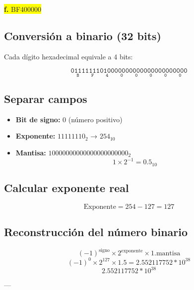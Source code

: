 \documentclass[a4paper,12pt]{article}
\begin{document}
	\begin{center}
		\colorbox{yellow}{\textbf{f.} BF400000}
		\subsection*{Conversión a binario (32 bits)}
		Cada dígito hexadecimal equivale a 4 bits:
		
		\[
		\mathtt{
			\underset{\text{B}}{\boxed{\mathtt{0111}}}
			\underset{\text{F}}{\boxed{\mathtt{1111}}}
			\underset{\text{4}}{\boxed{\mathtt{0100}}}
			\underset{\text{0}}{\boxed{\mathtt{0000}}}
			\underset{\text{0}}{\boxed{\mathtt{0000}}}
			\underset{\text{0}}{\boxed{\mathtt{0000}}}
			\underset{\text{0}}{\boxed{\mathtt{0000}}}
			\underset{\text{0}}{\boxed{\mathtt{0000}}}
		}	
		\]
		
		\subsection*{Separar campos}
		
		\begin{itemize}
			\item \textbf{Bit de signo:} 0 (número positivo)
			\item \textbf{Exponente:} $11111110_2$ → $254_{10}$
			\item \textbf{Mantisa:} $10000000000000000000000_2$ 
			\[
			1\times2^{-1}  = 0.5_{10}
			\]
		\end{itemize}
		
		\subsection*{Calcular exponente real}
		
		\[
		\text{Exponente} = 254 - 127 = 127
		\]
		
		
		
		\subsection*{Reconstrucción del número binario}	
		\[
		(-1)^{\text{signo}} \times 2^{\text{exponente}} \times 1.\text{mantisa}
		\]
		\[
		(-1)^0 \times 2^127 \times 1.5 = 2.552117752*10^{38}
		\]
		\vspace{1em}
		\[
		\boxed{2.552117752*10^{38}}
		\]
		
		---
	\end{center}
\end{document}
